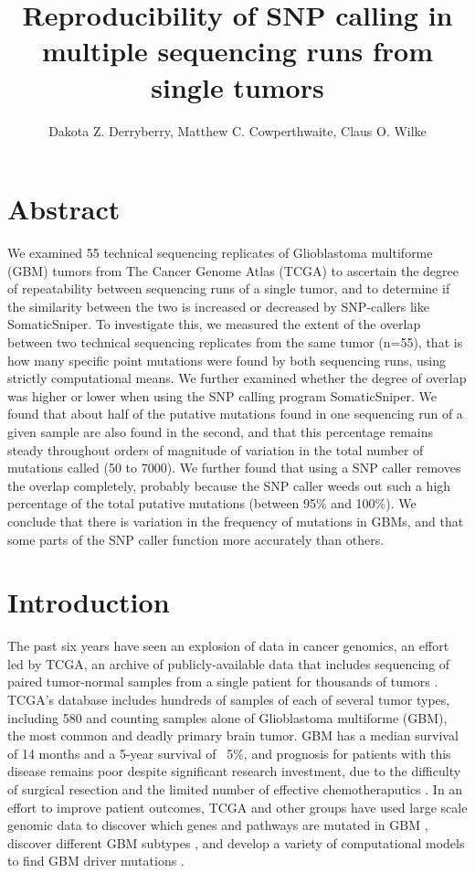 \documentclass[11pt]{article} %
\title{Reproducibility of SNP calling in multiple sequencing runs from single tumors}
\author{Dakota Z. Derryberry, Matthew C. Cowperthwaite, Claus O. Wilke}
\begin{document}
\maketitle

\section*{Abstract}

We examined 55 technical sequencing replicates of Glioblastoma multiforme (GBM) tumors from The Cancer Genome Atlas (TCGA) to ascertain the degree of repeatability between sequencing runs of a single tumor, and to determine if the similarity between the two is increased or decreased by SNP-callers like SomaticSniper. To investigate this, we measured the extent of the overlap between two technical sequencing replicates from the same tumor (n=55), that is how many specific point mutations were found by both sequencing runs, using strictly computational means. We further examined whether the degree of overlap was higher or lower when using the SNP calling program SomaticSniper.  We found that about half of the putative mutations found in one sequencing run of a given sample are also found in the second, and that this percentage remains steady throughout orders of magnitude of variation in the total number of mutations called (50 to 7000). We further found that using a SNP caller removes the overlap completely, probably because the SNP caller weeds out such a high percentage of the total putative mutations (between 95\% and 100\%). We conclude that there is variation in the frequency of mutations in GBMs, and that some parts of the SNP caller function more accurately than others.

\section*{Introduction}

The past six years have seen an explosion of data in cancer genomics, an effort led by TCGA, an archive of publicly-available data that includes sequencing of paired tumor-normal samples from a single patient for thousands of tumors \citep{TCGA-GBM, TCGA-GBM-13}. TCGA's database includes hundreds of samples of each of several tumor types, including 580 and counting samples alone of Glioblastoma multiforme (GBM), the most common and deadly primary brain tumor. GBM has a median survival of 14 months and a 5-year survival of ~5\%, and prognosis for patients with this disease remains poor despite significant research investment, due to the difficulty of surgical resection and the limited number of effective chemotheraputics \citep{GBM-stats}. In an effort to improve patient outcomes, TCGA and other groups \citep{Parsons} have used large scale genomic data to discover which genes and pathways are mutated in GBM \citep{pathways}, discover different GBM subtypes \citep{subtypes}, and develop a variety of computational models to find GBM driver mutations \citep{drivers}.
\end{document}
